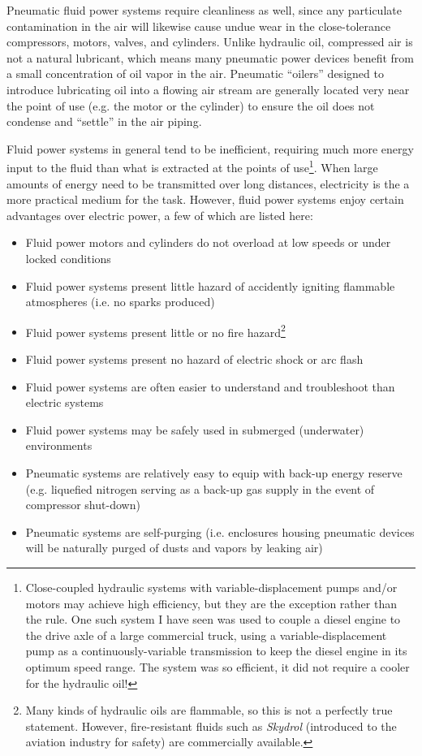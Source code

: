 Pneumatic fluid power systems require cleanliness as well, since any particulate contamination in the air will likewise cause undue wear in the close-tolerance compressors, motors, valves, and cylinders.  Unlike hydraulic oil, compressed air is not a natural lubricant, which means many pneumatic power devices benefit from a small concentration of oil vapor in the air.  Pneumatic ``oilers'' designed to introduce lubricating oil into a flowing air stream are generally located very near the point of use (e.g. the motor or the cylinder) to ensure the oil does not condense and ``settle'' in the air piping.

\vskip 10pt

\filbreak

Fluid power systems in general tend to be inefficient, requiring much more energy input to the fluid than what is extracted at the points of use\footnote{Close-coupled hydraulic systems with variable-displacement pumps and/or motors may achieve high efficiency, but they are the exception rather than the rule.  One such system I have seen was used to couple a diesel engine to the drive axle of a large commercial truck, using a variable-displacement pump as a continuously-variable transmission to keep the diesel engine in its optimum speed range.  The system was so efficient, it did not require a cooler for the hydraulic oil!}.  When large amounts of energy need to be transmitted over long distances, electricity is the a more practical medium for the task.  However, fluid power systems enjoy certain advantages over electric power, a few of which are listed here:

\begin{itemize}
\item Fluid power motors and cylinders do not overload at low speeds or under locked conditions
\item Fluid power systems present little hazard of accidently igniting flammable atmospheres (i.e. no sparks produced)
\item Fluid power systems present little or no fire hazard\footnote{Many kinds of hydraulic oils are flammable, so this is not a perfectly true statement.  However, fire-resistant fluids such as \textit{Skydrol} (introduced to the aviation industry for safety) are commercially available.} 
\item Fluid power systems present no hazard of electric shock or arc flash
\item Fluid power systems are often easier to understand and troubleshoot than electric systems
\item Fluid power systems may be safely used in submerged (underwater) environments
\item Pneumatic systems are relatively easy to equip with back-up energy reserve (e.g. liquefied nitrogen serving as a back-up gas supply in the event of compressor shut-down)
\item Pneumatic systems are self-purging (i.e. enclosures housing pneumatic devices will be naturally purged of dusts and vapors by leaking air)
\end{itemize}


